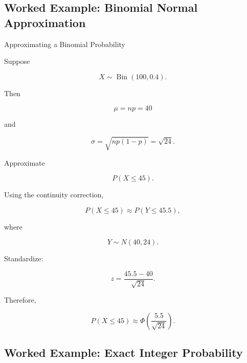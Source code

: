 \subsection{Worked Example: Binomial Normal Approximation}
\label{subsec:worked-binomial-normal-approx}

\begin{workedexamplebox}{Approximating a Binomial Probability}

Suppose

\[
X
\sim
\operatorname{Bin}(100,0.4).
\]

Then

\[
\mu=np=40
\]

and

\[
\sigma
=
\sqrt{
np(1-p)
}
=
\sqrt{24}.
\]

Approximate

\[
P(X\leq45).
\]

Using the continuity correction,

\[
P(X\leq45)
\approx
P(Y\leq45.5),
\]

where

\[
Y\sim N(40,24).
\]

Standardize:

\[
z
=
\frac{
45.5-40
}{
\sqrt{24}
}.
\]

Therefore,

\begin{answerbox}
\[
\boxed{
P(X\leq45)
\approx
\Phi
\left(
\frac{5.5}{\sqrt{24}}
\right).
}
\]
\end{answerbox}

\end{workedexamplebox}

\subsection{Worked Example: Exact Integer Probability}
\label{subsec:worked-continuity-single-value}

